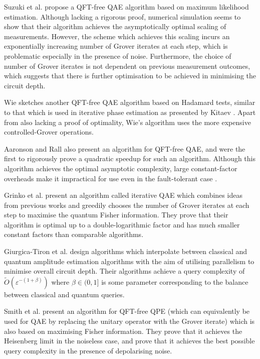 Suzuki et al. \cite{suzuki_2020_amp_without_phase} propose a QFT-free QAE algorithm based on maximum likelihood estimation. Although lacking a rigorous proof, numerical simulation seems to show that their algorithm achieves the asymptotically optimal scaling of measurements. However, the scheme which achieves this scaling incurs an exponentially increasing number of Grover iterates at each step, which is problematic especially in the presence of noise. Furthermore, the choice of number of Grover iterates is not dependent on previous measurement outcomes, which suggests that there is further optimisation to be achieved in minimising the circuit depth.

Wie \cite{wie_2019_simpler_q_counting} sketches another QFT-free QAE algorithm based on Hadamard tests, similar to that which is used in iterative phase estimation as presented by Kitaev \cite{kitaev_1995_mmts_abelian_stab}. Apart from also lacking a proof of optimality, Wie's algorithm uses the more expensive controlled-Grover operations.

Aaronson and Rall \cite{aaronson_2021_q_approx_counting} also present an algorithm for QFT-free QAE, and were the first to rigorously prove a quadratic speedup for such an algorithm. Although this algorithm achieves the optimal asymptotic complexity, large constant-factor overheads make it impractical for use even in the fault-tolerant case \cite{grinko_2021_iterative_qae}.

Grinko et al. \cite{grinko_2021_iterative_qae} present an algorithm called iterative QAE which combines ideas from previous works and greedily chooses the number of Grover iterates at each step to maximise the quantum Fisher information. They prove that their algorithm is optimal up to a double-logarithmic factor and has much smaller constant factors than comparable algorithms.

Giurgica-Tiron et al. \cite{giurgica_2022_low_depth_for_qae} design algorithms which interpolate between classical and quantum amplitude estimation algorithms with the aim of utilising parallelism to minimise overall circuit depth. Their algorithms achieve a query complexity of $ \tilde{O} \left( \varepsilon^{-(1 + \beta)} \right) $ where $\beta \in (0,1]$ is some parameter corresponding to the balance between classical and quantum queries.

Smith et al. \cite{smith_2023_adaptive_bayesian_qae} present an algorithm for QFT-free QPE (which can equivalently be used for QAE by replacing the unitary operator with the Grover iterate) which is also based on maximising Fisher information. They prove that it achieves the Heisenberg limit in the noiseless case, and prove that it achieves the best possible query complexity in the presence of depolarising noise.

